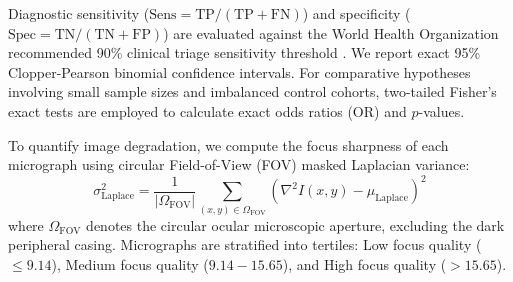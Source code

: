 \documentclass[10pt,journal,compsoc]{IEEEtran}
\begin{document}
Diagnostic sensitivity ($\text{Sens} = \text{TP} / (\text{TP} + \text{FN})$) and specificity ($\text{Spec} = \text{TN} / (\text{TN} + \text{FP})$) are evaluated against the World Health Organization recommended 90\% clinical triage sensitivity threshold \cite{who2016malaria}. We report exact 95\% Clopper-Pearson binomial confidence intervals. For comparative hypotheses involving small sample sizes and imbalanced control cohorts, two-tailed Fisher's exact tests are employed to calculate exact odds ratios (OR) and $p$-values.

To quantify image degradation, we compute the focus sharpness of each micrograph using circular Field-of-View (FOV) masked Laplacian variance:
\begin{equation}
    \sigma_{\text{Laplace}}^2 = \frac{1}{|\Omega_{\text{FOV}}|} \sum_{(x,y) \in \Omega_{\text{FOV}}} \left( \nabla^2 I(x,y) - \mu_{\text{Laplace}} \right)^2
\end{equation}
where $\Omega_{\text{FOV}}$ denotes the circular ocular microscopic aperture, excluding the dark peripheral casing. Micrographs are stratified into tertiles: Low focus quality ($\le 9.14$), Medium focus quality ($9.14 - 15.65$), and High focus quality ($> 15.65$).
\end{document}
